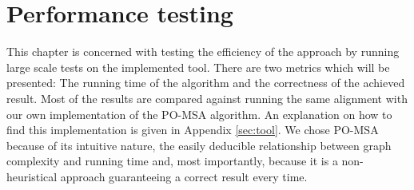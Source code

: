 \documentclass[thesis.tex]{subfiles}
\begin{document}
\chapter{Performance testing}
\label{sec:performance}
This chapter is concerned with testing the efficiency of the approach by running large scale tests on the implemented tool. There are two metrics which will be presented: The running time of the algorithm and the correctness of the achieved result. Most of the results are compared against running the same alignment with our own implementation of the PO-MSA algorithm. An explanation on how to find this implementation is given in Appendix \ref{sec:tool}. We chose PO-MSA because of its intuitive nature, the easily deducible relationship between graph complexity and running time and, most importantly, because it is a non-heuristical approach guaranteeing a correct result every time.
\end{document}
